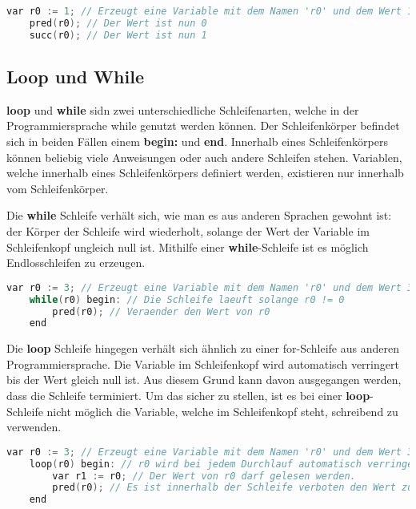 \begin{lstlisting}[language=c, caption=pred und succ in While, label={lst:while-pred-succ}]
	var r0 := 1; // Erzeugt eine Variable mit dem Namen 'r0' und dem Wert 1
	pred(r0); // Der Wert ist nun 0
	succ(r0); // Der Wert ist nun 1
\end{lstlisting}

\subsection{Loop und While}
\textbf{loop} und \textbf{while} sidn zwei unterschiedliche Schleifenarten, welche in der Programmiersprache while genutzt werden können. Der Schleifenkörper befindet sich in beiden Fällen einem \textbf{begin:} und \textbf{end}. Innerhalb eines Schleifenkörpers können beliebig viele Anweisungen oder auch andere Schleifen stehen. Variablen, welche innerhalb eines Schleifenkörpers definiert werden, existieren nur innerhalb vom Schleifenkörper.

Die \textbf{while} Schleife verhält sich, wie man es aus anderen Sprachen gewohnt ist: der Körper der Schleife wird wiederholt, solange der Wert der Variable im Schleifenkopf ungleich null ist. Mithilfe einer \textbf{while}-Schleife ist es möglich Endlosschleifen zu erzeugen.

\begin{lstlisting}[language=c, caption=while-Schleife in While, label={lst:while-while}]
	var r0 := 3; // Erzeugt eine Variable mit dem Namen 'r0' und dem Wert 3
	while(r0) begin: // Die Schleife laeuft solange r0 != 0
		pred(r0); // Veraender den Wert von r0
	end
\end{lstlisting}

Die \textbf{loop} Schleife hingegen verhält sich ähnlich zu einer for-Schleife aus anderen Programmiersprache. Die Variable im Schleifenkopf wird automatisch verringert bis der Wert gleich null ist. Aus diesem Grund kann davon ausgegangen werden, dass die Schleife terminiert. Um das sicher zu stellen, ist es bei einer \textbf{loop}-Schleife nicht möglich die Variable, welche im Schleifenkopf steht, schreibend zu verwenden. 

\begin{lstlisting}[language=c, caption=loop-Schleife in While, label={lst:while-loop}]
	var r0 := 3; // Erzeugt eine Variable mit dem Namen 'r0' und dem Wert 3
	loop(r0) begin: // r0 wird bei jedem Durchlauf automatisch verringert
		var r1 := r0; // Der Wert von r0 darf gelesen werden.
		pred(r0); // Es ist innerhalb der Schleife verboten den Wert zu aendern!
	end
\end{lstlisting}

